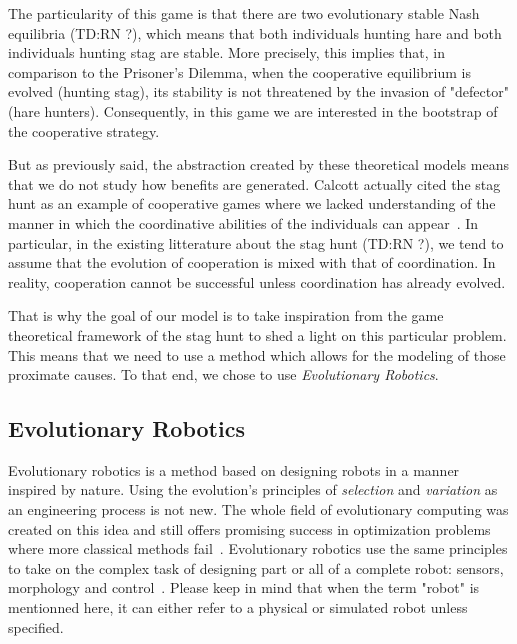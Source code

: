     The particularity of this game is that there are two evolutionary stable Nash equilibria (TD:RN ?), which means that both individuals hunting hare and both individuals hunting stag are stable. More precisely, this implies that, in comparison to the Prisoner's Dilemma, when the cooperative equilibrium is evolved (hunting stag), its stability is not threatened by the invasion of "defector" (hare hunters). Consequently, in this game we are interested in the bootstrap of the cooperative strategy.


    But as previously said, the abstraction created by these theoretical models means that we do not study how benefits are generated. Calcott actually cited the stag hunt as an example of cooperative games where we lacked understanding of the manner in which the coordinative abilities of the individuals can appear~\cite{Calcott2008}. In particular, in the existing litterature about the stag hunt (TD:RN ?), we tend to assume that the evolution of cooperation is mixed with that of coordination. In reality, cooperation cannot be successful unless coordination has already evolved.

    That is why the goal of our model is to take inspiration from the game theoretical framework of the stag hunt to shed a light on this particular problem. This means that we need to use a method which allows for the modeling of those proximate causes. To that end, we chose to use \emph{Evolutionary Robotics}.


  \subsection{Evolutionary Robotics}

    Evolutionary robotics is a method based on designing robots in a manner inspired by nature. Using the evolution's principles of \emph{selection} and \emph{variation} as an engineering process is not new. The whole field of evolutionary computing was created on this idea and still offers promising success in optimization problems where more classical methods fail~\cite{Eiben2003}. Evolutionary robotics use the same principles to take on the complex task of designing part or all of a complete robot: sensors, morphology and control~\cite{Nolfi2000, Doncieux2015}. Please keep in mind that when the term "robot" is mentionned here, it can either refer to a physical or simulated robot unless specified.

